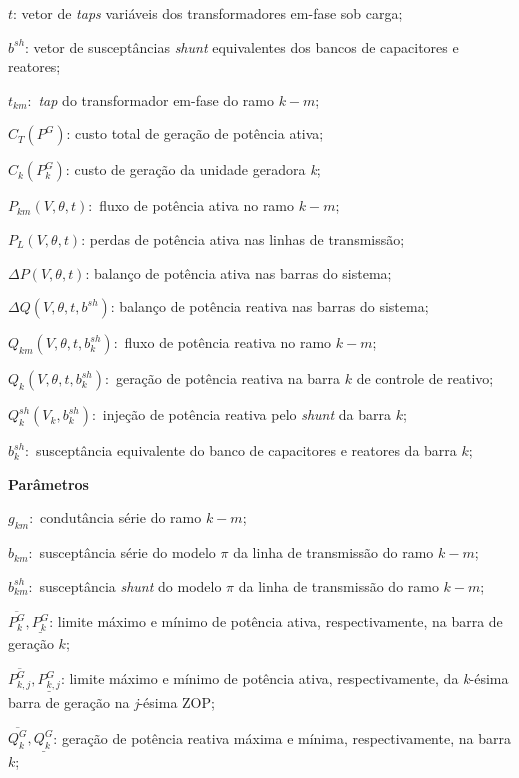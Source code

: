 \documentclass[
	12pt,				%
	openany,			%
	twoside,			%
	a4paper,			%
	chapter=TITLE,		%
	section=Title,		%
	subsection=Title,	%
	subsubsection=Title,%
	english,			%
	french,				%
	spanish,			%
	brazil			%
	]{abntex2}
\begin{document}
\begin{ERRATA}
\noindent $t$: vetor de \emph{taps} variáveis dos transformadores em-fase sob carga;

\noindent $b^{sh}$: vetor de susceptâncias \emph{shunt} equivalentes dos bancos de capacitores e reatores;

\noindent $t_{km}:$ \textit{tap} do transformador em-fase do ramo $k-m$;

\noindent $C_T(P^{G})$: custo total de geração de potência ativa;

\noindent $C_k(P^{G}_k)$: custo de geração da unidade geradora \emph{k};

\noindent $P_{km}(V,\theta,t):$ fluxo de potência ativa no ramo $k-m$;

\noindent $P_L(V,\theta,t)$: perdas de potência ativa nas linhas de transmissão;

\noindent $\Delta P(V,\theta,t)$:  balanço de potência ativa nas barras do sistema;

\noindent $\Delta Q(V,\theta,t, b^{sh})$: balanço de potência reativa nas barras do sistema;

\noindent $Q_{km}(V,\theta,t, b_k^{sh}):$ fluxo de potência reativa no ramo $k-m$;

\noindent $Q_{k}(V,\theta,t, b_k^{sh}):$ geração de potência reativa na barra $k$ de controle de reativo;

\noindent $Q_{k}^{sh}(V_k,b_k^{sh}):$ injeção de potência reativa pelo \textit{shunt} da barra $k$;

\noindent $b_{k}^{sh}:$ susceptância equivalente do banco de capacitores e reatores da barra $k$;

\noindent \textbf{Parâmetros}

\noindent $g_{km}:$ condutância série do ramo $k-m$;

\noindent $b_{km}:$ susceptância série do modelo $\pi$ da linha de transmissão do ramo $k-m$;

\noindent $b_{km}^{sh}:$ susceptância \textit{shunt} do modelo $\pi$ da linha de transmissão do ramo $k-m$;

\noindent $\overline{P^{G}_{k}}, \underline{P^{G}_{k}}$: limite máximo e mínimo de potência ativa, respectivamente, na barra de geração $k$;

\noindent $\overline{P^{G}_{k,j}}, \underline{P^{G}_{k,j}}$: limite máximo e mínimo de potência ativa, respectivamente, da \emph{k}-ésima barra de geração na \emph{j}-ésima ZOP;

\noindent $\overline{Q^{G}_{k}}, \underline{Q^{G}_{k}}$: geração de potência reativa máxima e mínima, respectivamente, na barra $k$;


\end{ERRATA}
\end{document}
